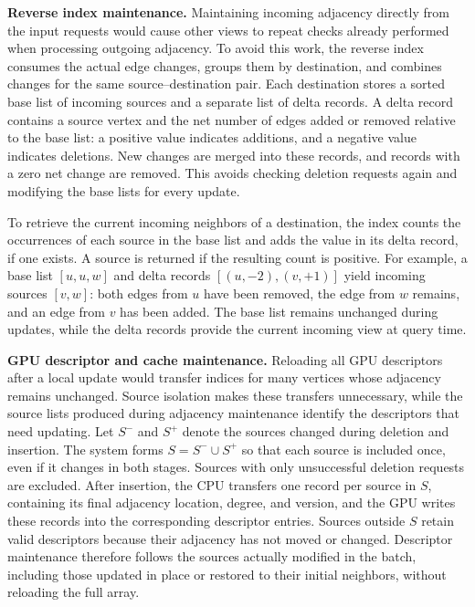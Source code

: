 \textbf{Reverse index maintenance.} Maintaining incoming adjacency directly from the input requests would cause other views to repeat checks already performed when processing outgoing adjacency. To avoid this work, the reverse index consumes the actual edge changes, groups them by destination, and combines changes for the same source–destination pair. Each destination stores a sorted base list of incoming sources and a separate list of delta records. A delta record contains a source vertex and the net number of edges added or removed relative to the base list: a positive value indicates additions, and a negative value indicates deletions. New changes are merged into these records, and records with a zero net change are removed. This avoids checking deletion requests again and modifying the base lists for every update.

To retrieve the current incoming neighbors of a destination, the index counts the occurrences of each source in the base list and adds the value in its delta record, if one exists. A source is returned if the resulting count is positive. For example, a base list $[u,u,w]$ and delta records $[(u,-2),(v,+1)]$ yield incoming sources $[v,w]$: both edges from $u$ have been removed, the edge from $w$ remains, and an edge from $v$ has been added. The base list remains unchanged during updates, while the delta records provide the current incoming view at query time.


\textbf{GPU descriptor and cache maintenance.} Reloading all GPU descriptors after a local update would transfer indices for many vertices whose adjacency remains unchanged. Source isolation makes these transfers unnecessary, while the source lists produced during adjacency maintenance identify the descriptors that need updating. Let $S^-$ and $S^+$ denote the sources changed during deletion and insertion. The system forms $S=S^-\cup S^+$ so that each source is included once, even if it changes in both stages. Sources with only unsuccessful deletion requests are excluded. After insertion, the CPU transfers one record per source in $S$, containing its final adjacency location, degree, and version, and the GPU writes these records into the corresponding descriptor entries. Sources outside $S$ retain valid descriptors because their adjacency has not moved or changed. Descriptor maintenance therefore follows the sources actually modified in the batch, including those updated in place or restored to their initial neighbors, without reloading the full array.

